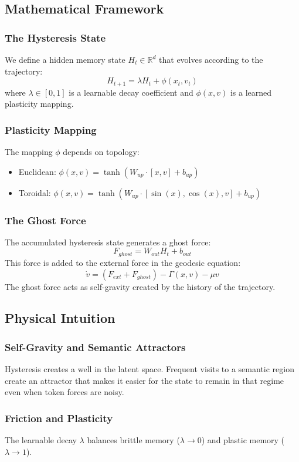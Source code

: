 \documentclass{article}
\numberwithin{equation}{section}
\begin{document}
\subsection{Mathematical Framework}
\subsubsection{The Hysteresis State}
We define a hidden memory state $H_t \in \mathbb{R}^d$ that evolves according to the trajectory:
\[
H_{t+1} = \lambda H_t + \phi(x_t, v_t)
\]
where $\lambda \in [0, 1]$ is a learnable decay coefficient and $\phi(x, v)$ is a learned plasticity mapping.

\subsubsection{Plasticity Mapping}
The mapping $\phi$ depends on topology:
\begin{itemize}
\item Euclidean: $\phi(x, v) = \tanh(W_{up} \cdot [x, v] + b_{up})$
\item Toroidal: $\phi(x, v) = \tanh(W_{up} \cdot [\sin(x), \cos(x), v] + b_{up})$
\end{itemize}

\subsubsection{The Ghost Force}
The accumulated hysteresis state generates a ghost force:
\[
F_{ghost} = W_{out} H_t + b_{out}
\]
This force is added to the external force in the geodesic equation:
\[
\dot{v} = (F_{ext} + F_{ghost}) - \Gamma(x, v) - \mu v
\]
The ghost force acts as self-gravity created by the history of the trajectory.

\subsection{Physical Intuition}
\subsubsection{Self-Gravity and Semantic Attractors}
Hysteresis creates a well in the latent space. Frequent visits to a semantic region create an attractor that makes it easier for the state to remain in that regime even when token forces are noisy.

\subsubsection{Friction and Plasticity}
The learnable decay $\lambda$ balances brittle memory ($\lambda \to 0$) and plastic memory ($\lambda \to 1$).
\end{document}
